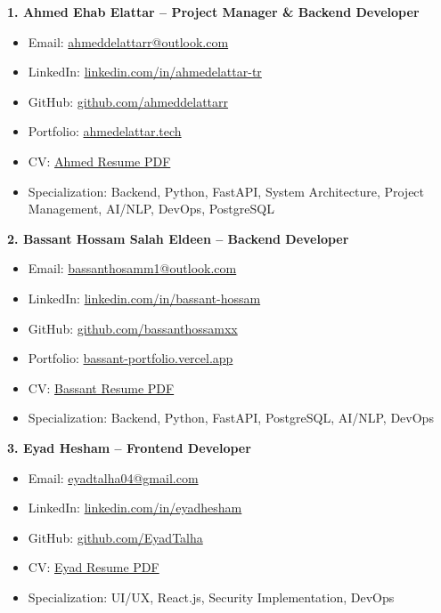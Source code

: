 \documentclass[20pt,a4paper]{article}
\begin{document}
\textbf{1. Ahmed Ehab Elattar – Project Manager \& Backend Developer}  
\begin{itemize}
    \item Email: \href{mailto:ahmeddelattarr@outlook.com}{ahmeddelattarr@outlook.com}
    \item LinkedIn: \href{https://www.linkedin.com/in/ahmedelattar-tr}{linkedin.com/in/ahmedelattar-tr}
    \item GitHub: \href{https://github.com/ahmeddelattarr}{github.com/ahmeddelattarr}
    \item Portfolio: \href{https://www.ahmedelattar.tech}{ahmedelattar.tech}
    \item CV: \href{https://www.ahmedelattar.tech/resume.pdf}{Ahmed Resume PDF}
    \item Specialization: Backend, Python, FastAPI, System Architecture, Project Management, AI/NLP, DevOps, PostgreSQL
\end{itemize}
\newpage
\textbf{2. Bassant Hossam Salah Eldeen – Backend Developer}  
\begin{itemize}
    \item Email: \href{mailto:bassanthosamm1@outlook.com}{bassanthosamm1@outlook.com}
    \item LinkedIn: \href{https://www.linkedin.com/in/bassant-hossam-5a4177264}{linkedin.com/in/bassant-hossam}
    \item GitHub: \href{https://github.com/Bassanthossamxx}{github.com/bassanthossamxx}
    \item Portfolio: \href{https://bassant-portfolio.vercel.app}{bassant-portfolio.vercel.app}
    \item CV: \href{https://bassant-portfolio.vercel.app/assets/Bassant_Hossam_CV.pdf}{Bassant Resume PDF}
    \item Specialization: Backend, Python, FastAPI, PostgreSQL, AI/NLP, DevOps
\end{itemize}

\textbf{3. Eyad Hesham – Frontend Developer}  
\begin{itemize}
    \item Email: \href{mailto:eyadtalha04@gmail.com}{eyadtalha04@gmail.com}
    \item LinkedIn: \href{https://www.linkedin.com/in/eyadhesham}{linkedin.com/in/eyadhesham}
    \item GitHub: \href{https://github.com/EyadTalha}{github.com/EyadTalha}
    \item CV: \href{https://drive.google.com/file/d/1gIWggXZtLGkVX9wEBdzE1umS1afZiNBz/view?usp=sharing}{Eyad Resume PDF}
    \item Specialization: UI/UX, React.js, Security Implementation, DevOps
\end{itemize}
\end{document}

